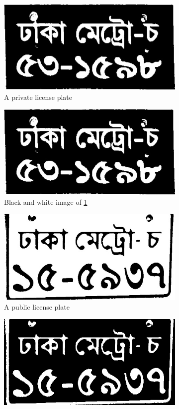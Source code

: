 \documentclass{standalone}
\begin{document}
\begin{figure}
\begin{subfigure}{.5\textwidth}
  \centering
  \includegraphics[width=.8\linewidth]{./img/sample/bnw-1.jpg}
  \caption{A private license plate}
  \label{fig:PrivatePlate}
\end{subfigure}
\begin{subfigure}{.5\textwidth}
  \centering
  \includegraphics[width=.8\linewidth]{./img/sample/bnw-2.jpg}
  \caption{Black and white image of \ref{fig:PrivatePlate}}
\end{subfigure}
\begin{subfigure}{.5\textwidth}
  \centering
  \includegraphics[width=.8\linewidth]{./img/sample/bnw-3.jpg}
  \caption{A public license plate}
  \label{fig:PublicPlate}
\end{subfigure}
\begin{subfigure}{.5\textwidth}
  \centering
  \includegraphics[width=.8\linewidth]{./img/sample/bnw-4.jpg}

\end{subfigure}
\end{figure}
\end{document}
